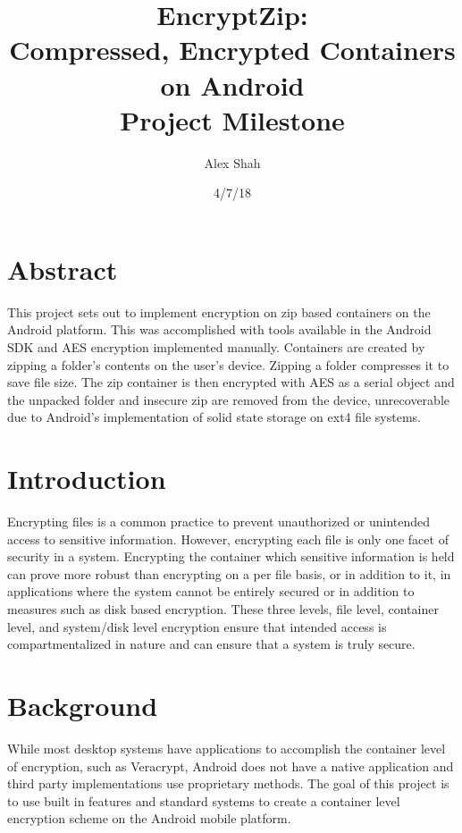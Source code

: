 \documentclass[10pt,a4paper]{article}
\begin{document}
\title{EncryptZip: \\ Compressed, Encrypted Containers on Android \\ Project Milestone}
\author{Alex Shah}
\date{4/7/18}

\maketitle

\section{Abstract}
This project sets out to implement encryption on zip based containers on the Android platform. This was accomplished with tools available in the Android SDK and AES encryption implemented manually. Containers are created by zipping a folder's contents on the user's device. Zipping a folder compresses it to save file size. The zip container is then encrypted with AES as a serial object and the unpacked folder and insecure zip are removed from the device, unrecoverable due to Android's implementation of solid state storage on ext4 file systems.

\section{Introduction}
Encrypting files is a common practice to prevent unauthorized or unintended access to sensitive information. However, encrypting each file is only one facet of security in a system. Encrypting the container which sensitive information is held can prove more robust than encrypting on a per file basis, or in addition to it, in applications where the system cannot be entirely secured or in addition to measures such as disk based encryption. These three levels, file level, container level, and system/disk level encryption ensure that intended access is compartmentalized in nature and can ensure that a system is truly secure. 

\section{Background}
While most desktop systems have applications to accomplish the container level of encryption, such as Veracrypt, Android does not have a native application and third party implementations use proprietary methods. The goal of this project is to use built in features and standard systems to create a container level encryption scheme on the Android mobile platform.
\end{document}
